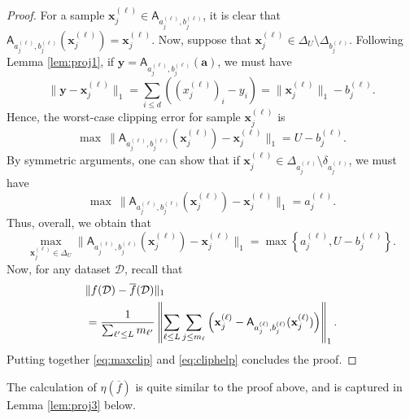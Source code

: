 \documentclass[conference,letterpaper]{IEEEtran}
\theoremstyle{remark}
\theoremstyle{definition}
\begin{document}
\begin{proof}
	For a sample $\mathbf{x}_j^{(\ell)}\in \mathsf{A}_{a_j^{(\ell)},b_j^{(\ell)}}$, it is clear that $\mathsf{A}_{a_j^{(\ell)},b_j^{(\ell)}}(\mathbf{x}_j^{(\ell)}) = \mathbf{x}_j^{(\ell)}$. Now, suppose that $\mathbf{x}_j^{(\ell)}\in \Delta_U\setminus \Delta_{b_j^{(\ell)}}$. Following Lemma \ref{lem:proj1}, if $\mathbf{y} = \mathsf{A}_{a_j^{(\ell)},b_j^{(\ell)}}(\mathbf{a})$, we must have $$\lVert \mathbf{y} - \mathbf{x}_j^{(\ell)}\rVert_1 = \sum_{i\leq d} ((x_j^{(\ell)})_i - y_i) = \lVert \mathbf{x}_j^{(\ell)}\rVert_1 - b_j^{(\ell)}.$$ Hence, the worst-case clipping error for sample $\mathbf{x}_j^{(\ell)}$ is $$\max\ \lVert \mathsf{A}_{a_j^{(\ell)},b_j^{(\ell)}}(\mathbf{x}_j^{(\ell)}) - \mathbf{x}_j^{(\ell)}\rVert_1 = U-b_j^{(\ell)}.$$ By symmetric arguments, one can show that if $\mathbf{x}_j^{(\ell)}\in \Delta_{a_j^{(\ell)}}\setminus \delta_{a_j^{(\ell)}}$, we must have $$\max\ \lVert \mathsf{A}_{a_j^{(\ell)},b_j^{(\ell)}}(\mathbf{x}_j^{(\ell)}) - \mathbf{x}_j^{(\ell)}\rVert_1 = a_j^{(\ell)}.$$ Thus, overall, we obtain that 
	\begin{equation}\max_{\mathbf{x}_j^{(\ell)}\in \Delta_U} \lVert \mathsf{A}_{a_j^{(\ell)},b_j^{(\ell)}}(\mathbf{x}_j^{(\ell)}) - \mathbf{x}_j^{(\ell)}\rVert_1 = \max\left\{a_j^{(\ell)},U-b_j^{(\ell)}\right\}. \label{eq:maxclip}\end{equation} 
	Now, for any dataset $\mathcal{D}$, recall that
	\begin{align}
		&\lVert f(\mathcal{D})-\overline{f}(\mathcal{D})\rVert_1 \notag\\
		&=\frac{1}{\sum_{\ell'\leq L} m_{\ell'}}\left\lVert \sum_{\ell\leq L}\sum_{j\leq m_\ell} \left(\mathbf{x}_j^{(\ell)} - \mathsf{A}_{a_j^{(\ell)},b_j^{(\ell)}}(\mathbf{x}_j^{(\ell)}) \right)\right \rVert_1. \label{eq:cliphelp}
	\end{align}
	Putting together \eqref{eq:maxclip} and \eqref{eq:cliphelp} concludes the proof.
\end{proof}
The calculation of $\eta(\overline{f})$ is quite similar to the proof above, and is captured in Lemma \ref{lem:proj3} below.
\end{document}
